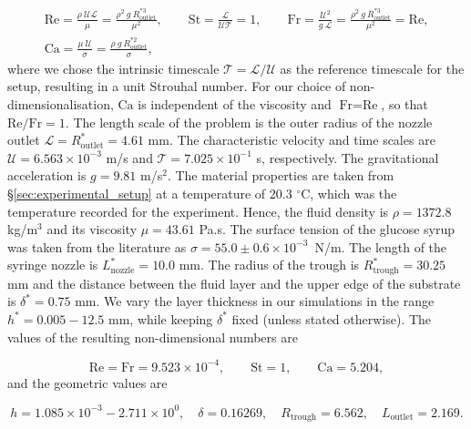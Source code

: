 \documentclass[aip,graphicx]{revtex4-1}
\newcommand{\sym}[1]{\text{#1}} \newcommand{\dif}{\mathrm{d}}
\begin{document}
\begin{gather}
 \sym{Re} = \frac{\rho \: \mathcal{U L}}{\mu} = \frac{\rho^2 \: g \:
   R_{\sym{outlet}}^{*3}}{\mu^2}, \qquad \sym{St} =
 \frac{\mathcal{L}}{\mathcal{U} \mathcal{T}} = 1, \qquad \sym{Fr} =
 \frac{\mathcal{U}^2}{g \: \mathcal{L}} = \frac{\rho^2 \: g \:
   R_{\sym{outlet}}^{*3}}{\mu^2} = \sym{Re}, \nonumber \\[0.75cm]
 \sym{Ca} = \frac{\mu \: \mathcal{U}}{\sigma} = \frac{\rho \: g \:
   R_{\sym{outlet}}^{*2}}{\sigma},
 \label{eqn:nondim_numbers}
\end{gather}
where we chose the
intrinsic timescale $\mathcal{T}=\mathcal{L}/\mathcal{U}$ as the reference timescale for the setup, resulting in a unit Strouhal number.
For our choice of non-dimensionalisation, $\sym{Ca}$ is independent
of the viscosity and $\sym{Fr}=\sym{Re}$, so that $\sym{Re}/\sym{Fr} =
1$.
The length scale of the problem is the outer radius of the nozzle
outlet $\mathcal{L}=R_{\sym{outlet}}^*=4.61$ mm.
The characteristic velocity and time scales are $\mathcal{U}=6.563
\times 10^{-3}$ m/s and $\mathcal{T}=7.025 \times 10^{-1}$ s,
respectively.
The gravitational acceleration is $g=9.81$ m/s$^2$.
The material properties are taken from \S \ref{sec:experimental_setup}
at a temperature of 20.3 $^{\circ}$C, which was the temperature
recorded for the experiment.
Hence, the fluid density is $\rho=1372.8$ kg/m$^3$ and its viscosity $\mu=43.61$
Pa.s.
The surface tension of the glucose syrup was taken from the 
literature \cite{montanez2013influence} as $\sigma=55.0 \pm 0.6 \times
10^{-3}$~N/m.
The length of the syringe nozzle is $L_{\sym{nozzle}}^*=10.0$ mm.
The radius of the trough is $R_{\sym{trough}}^*=30.25$ mm and the
distance between the fluid layer and the upper edge of the substrate
is $\delta^*=0.75$ mm.
We vary the layer thickness in our simulations in the range $h^*=0.005
- 12.5$ mm, while keeping $\delta^*$ fixed (unless stated otherwise).
The values of the resulting non-dimensional numbers are

\begin{equation}
 \sym{Re} = \sym{Fr} = 9.523 \times 10^{-4}, \qquad \sym{St}=1, \qquad
 \sym{Ca}=5.204,
\end{equation}
and the geometric values are

\begin{equation}
 h = 1.085 \times 10^{-3} - 2.711 \times 10^{0}, \quad \delta=0.16269, \quad R_{\sym{trough}}=6.562, \quad
 L_{\sym{outlet}}=2.169.
\end{equation}
\end{document}
